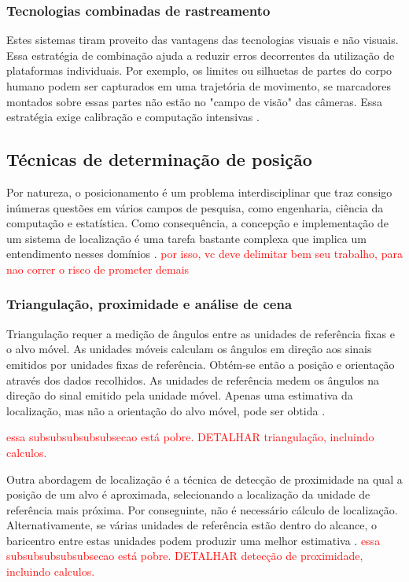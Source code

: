 \subsubsection{Tecnologias combinadas de rastreamento}\label{sec:rastre-robo}
Estes sistemas tiram proveito das vantagens das tecnologias visuais e não visuais. Essa estratégia de combinação ajuda a reduzir erros decorrentes da utilização de plataformas individuais. Por exemplo, os limites ou silhuetas de partes do corpo humano podem ser capturados em uma trajetória de movimento, se marcadores montados sobre essas partes não estão no "campo de visão" das câmeras. Essa estratégia exige calibração e computação intensivas \cite{zhou2008human}.

\subsection{Técnicas de determinação de posição}\label{sec:determ-posic}
Por natureza, o posicionamento é um problema interdisciplinar que traz consigo inúmeras questões em vários campos de pesquisa, como engenharia, ciência da computação e estatística. Como consequência, a concepção e implementação de um sistema de localização é uma tarefa bastante complexa que implica um entendimento nesses domínios \cite{linde2006aspects}. \textcolor{red}{por isso, vc deve delimitar bem seu trabalho, para nao correr o risco de prometer demais}

\subsubsection{Triangulação, proximidade e análise de cena}\label{sec:triang}

Triangulação requer a medição de ângulos entre as unidades de referência fixas e o alvo móvel. As unidades móveis calculam os ângulos em direção aos sinais emitidos por unidades fixas de referência. Obtém-se então a posição e orientação através dos dados recolhidos. As unidades de referência medem os ângulos na direção do sinal emitido pela unidade móvel. Apenas uma estimativa da localização, mas não a orientação do alvo móvel, pode ser obtida \cite{lutzke2013experimental}.

 \textcolor{red}{essa subsubsubsubsubsecao está pobre. DETALHAR triangulação, incluindo calculos.}


Outra abordagem de localização é a técnica de detecção de proximidade na qual a posição de um alvo é aproximada, selecionando a localização da unidade de referência mais próxima. Por conseguinte, não é necessário cálculo de localização. Alternativamente, se várias unidades de referência estão dentro do alcance, o baricentro entre estas unidades podem produzir uma melhor estimativa \cite{EHuber1996}.
 \textcolor{red}{essa subsubsubsubsubsecao está pobre. DETALHAR detecção de proximidade, incluindo calculos.}

